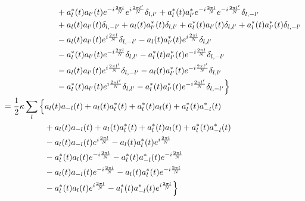 \documentclass{article}
\begin{document}
\begin{align*}
    & \hspace{0.9in} + a_l^* (t) a_{l'} (t) e^{-i \frac{2 \pi l}{N}} e^{i \frac{2 \pi l'}{N}} \delta_{l,l'} + a_l^* (t) a_{l'}^* e^{-i \frac{2 \pi l}{N}} e^{-i \frac{2 \pi l'}{N}} \delta_{l,-l'} \\
    & \hspace{0.9in} + a_l (t) a_{l'} (t) \delta_{l,-l'} + a_l (t) a_{l'}^* (t) \delta_{l,l'} + a_l^* (t) a_{l'} (t) \delta_{l,l'} + a_l^* (t) a_{l'}^* (t) \delta_{l,-l'} \\
    & \hspace{0.9in} - a_l (t) a_{l'} (t) e^{i \frac{2 \pi l}{N}} \delta_{l,-l'} - a_l (t) a_{l'}^* (t) e^{i \frac{2 \pi l}{N}} \delta_{l,l'} \\
    & \hspace{0.9in} - a_l^* (t) a_{l'} (t) e^{-i \frac{2 \pi l}{N}} \delta_{l,l'} - a_l^* (t) a_{l'}^* (t) e^{-i \frac{2 \pi l}{N}} \delta_{l,-l'} \\
    & \hspace{0.9in} - a_l (t) a_{l'} (t) e^{i \frac{2 \pi l'}{N}} \delta_{l,-l'} - a_l (t) a_{l'}^* (t) e^{-i \frac{2 \pi l'}{N}} \delta_{l,l'} \\
    & \hspace{0.9in} - a_l^* (t) a_{l'} (t) e^{i \frac{2 \pi l'}{N}} \delta_{l,l'} - a_l^* (t) a_{l'}^* (t) e^{-i \frac{2 \pi l'}{N}} \delta_{l,-l'} \Big\rbrace \\
    &= \frac{1}{2} \kappa \sum_l \Big\lbrace a_l (t) a_{-l} (t) + a_l (t) a_l^* (t) + a_l^* (t) a_l (t) + a_l^* (t) a_{-l}^* (t) \\
    & \hspace{0.7in} + a_l (t) a_{-l} (t) + a_l (t) a_l^* (t) + a_l^* (t) a_l (t) + a_l^* (t) a_{-l}^* (t) \\
    & \hspace{0.7in} - a_l (t) a_{-l} (t) e^{i \frac{2 \pi l}{N}} - a_l (t) a_l^* (t) e^{i \frac{2 \pi l}{N}} \\
    & \hspace{0.7in} - a_l^* (t) a_l (t) e^{-i \frac{2 \pi l}{N}} - a_l^* (t) a_{-l}^* (t) e^{-i \frac{2 \pi l}{N}} \\
    & \hspace{0.7in} - a_l (t) a_{-l} (t) e^{-i \frac{2 \pi l}{N}} - a_l (t) a_l^* (t) e^{-i \frac{2 \pi l}{N}} \\
    & \hspace{0.7in} - a_l^* (t) a_l (t) e^{i \frac{2 \pi l}{N}} - a_l^* (t) a_{-l}^* (t) e^{i \frac{2 \pi l}{N}} \Big\rbrace \\

\end{align*}
\end{document}
